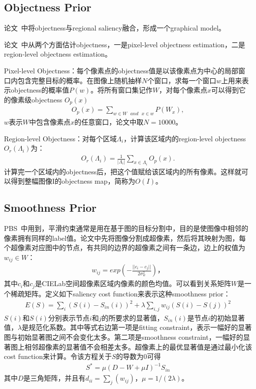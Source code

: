 \documentclass[12pt]{article}
\begin{document}
\subsection{Objectness Prior}

论文~\cite{chang2011fusing}中将objectness与regional saliency融合，形成一个graphical model。

论文~\cite{jiangpeng2013salient}中从两个方面估计objectness，一是pixel-level objectness estimation，二是region-level objectness estimation。

Pixel-level Objectness：每个像素点的objectness值是以该像素点为中心的局部窗口内包含完整目标的概率。在图像上随机抽样$N$个窗口，求每一个窗口$w$上用来表示objectness的概率值$P(w)$。将所有窗口集记作$W$，对每个像素点$x$可以得到它的像素级objectness $O_p(x)$
\begin{align}
O_p(x) = \sum_{w \in W \text{ }and \text{ } x \in w} P(W_x),
\end{align}
$w$表示$W$中包含像素点$x$的任意窗口，论文中取$N=10000$。

Region-level Objectness：对每个区域$\Lambda_i$，计算该区域内的region-level objectness $O_r(\Lambda_i)$为：
\begin{align}
O_r(\Lambda_i) = \frac{1}{|\Lambda_i|}\sum_{x \in \Lambda_i} O_p(x).
\end{align}
计算完一个区域内的objectness后，把这个值赋给该区域内的所有像素。这样就可以得到整幅图像I的objectness map，简称为$O(I)$。

\subsection{Smoothness Prior}

PBS~\cite{yang2013graph}中用到，平滑约束通常是用在基于图的目标分割中，目的是使图像中相邻的像素拥有同样的label值。论文中先将图像分割成超像素，然后将其映射为图，每个超像素对应图中的节点，有共同的边界的超像素之间有一条边，边上的权值为$w_{ij} \in W$：
\begin{align}
w_{ij} = exp\left(-\frac{||c_i-c_j||}{2\sigma_w^2}\right)，
\end{align}
其中$c_i$和$c_j$是CIELab空间超像素区域内像素的颜色均值。可以看到关系矩阵$W$是一个稀疏矩阵。定义如下saliency cost function来表示这种smoothness prior：
\begin{align}
E(S) = \sum_i(S(i)-S_{in}(i))^2+\lambda\sum_{i,j}w_{ij}(S(i)-S(j))^2
\end{align}
$S(i)$和$S(i)$分别表示节点$i$和$j$的所要求的显著值，$S_{in}(i)$是节点$i$的初始显著值，$\lambda$是规范化系数。其中等式右边第一项是fitting constraint，表示一幅好的显著图与初始显著图之间不会变化太多。第二项是smoothness constraint，一幅好的显著图上相邻超像素的显著值不会相差太多。超像素上的最优显著值是通过最小化该cost function来计算。令该方程关于$S$的导数为0可得
\begin{align}
S^* = \mu (D-W+\mu I)^{-1}S_{in}
\end{align}
其中$D$是三角矩阵，并且有$d_{ii} = \sum_j (w_{ij})$，$\mu = 1/(2\lambda)$。
\end{document}
